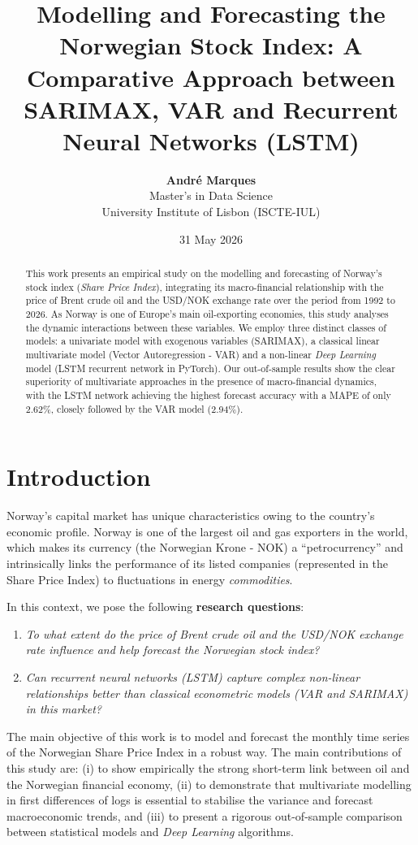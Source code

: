 \documentclass[11pt,a4paper]{article}
\title{\textbf{Modelling and Forecasting the Norwegian Stock Index: A Comparative Approach between SARIMAX, VAR and Recurrent Neural Networks (LSTM)}}
\author{
  \textbf{André Marques} \\
  Master's in Data Science \\
  University Institute of Lisbon (ISCTE-IUL)
}
\date{31 May 2026}
\begin{document}
\maketitle

\begin{abstract}
This work presents an empirical study on the modelling and forecasting of Norway's stock index (\textit{Share Price Index}), integrating its macro-financial relationship with the price of Brent crude oil and the USD/NOK exchange rate over the period from 1992 to 2026. As Norway is one of Europe's main oil-exporting economies, this study analyses the dynamic interactions between these variables. We employ three distinct classes of models: a univariate model with exogenous variables (SARIMAX), a classical linear multivariate model (Vector Autoregression - VAR) and a non-linear \textit{Deep Learning} model (LSTM recurrent network in PyTorch). Our out-of-sample results show the clear superiority of multivariate approaches in the presence of macro-financial dynamics, with the LSTM network achieving the highest forecast accuracy with a MAPE of only 2.62\%, closely followed by the VAR model (2.94\%).
\end{abstract}

\section{Introduction}
Norway's capital market has unique characteristics owing to the country's economic profile. Norway is one of the largest oil and gas exporters in the world, which makes its currency (the Norwegian Krone - NOK) a ``petrocurrency'' and intrinsically links the performance of its listed companies (represented in the Share Price Index) to fluctuations in energy \textit{commodities}.

In this context, we pose the following \textbf{research questions}:
\begin{enumerate}
    \item \textit{To what extent do the price of Brent crude oil and the USD/NOK exchange rate influence and help forecast the Norwegian stock index?}
    \item \textit{Can recurrent neural networks (LSTM) capture complex non-linear relationships better than classical econometric models (VAR and SARIMAX) in this market?}
\end{enumerate}

The main objective of this work is to model and forecast the monthly time series of the Norwegian Share Price Index in a robust way. The main contributions of this study are: (i) to show empirically the strong short-term link between oil and the Norwegian financial economy, (ii) to demonstrate that multivariate modelling in first differences of logs is essential to stabilise the variance and forecast macroeconomic trends, and (iii) to present a rigorous out-of-sample comparison between statistical models and \textit{Deep Learning} algorithms.
\end{document}
